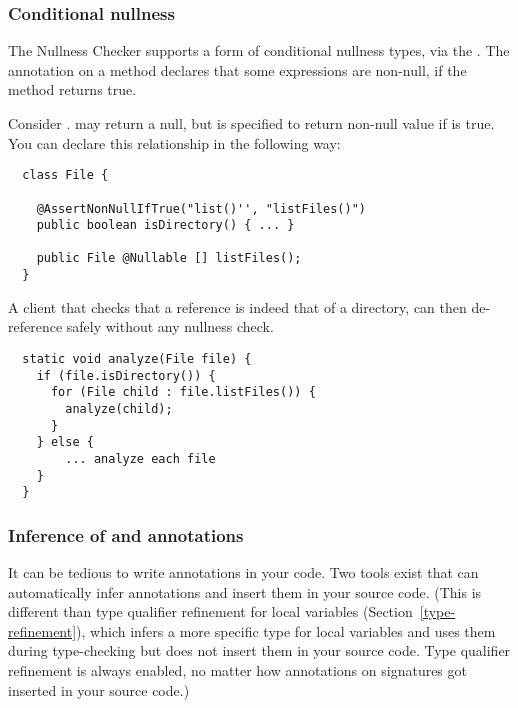 \subsubsection{Conditional nullness}

The Nullness Checker supports a form of conditional nullness types, via the
.  The annotation
on a method declares that some expressions are non-null, if the method
returns true.

Consider .
 may
return a null, but is specified to return non-null value if
 is
true.  You can declare this relationship in the following way:

\begin{Verbatim}
  class File {

    @AssertNonNullIfTrue("list()'', "listFiles()")
    public boolean isDirectory() { ... }

    public File @Nullable [] listFiles();
  }
\end{Verbatim}

A client that checks that a  reference is indeed that of a directory,
can then de-reference  safely without any nullness check.

\begin{Verbatim}
  static void analyze(File file) {
    if (file.isDirectory()) {
      for (File child : file.listFiles()) {
        analyze(child);
      }
    } else {
        ... analyze each file
    }
  }
\end{Verbatim}


\subsubsection{Inference of  and  annotations\label{nullness-inference}}

It can be tedious to write annotations in your code.  Two tools exist that
can automatically infer annotations and insert them in your source code.
(This is different than type qualifier refinement for local variables
(Section~\ref{type-refinement}), which infers a more specific type for
local variables and uses them during type-checking but does not insert them
in your source code.  Type qualifier refinement is always enabled, no
matter how annotations on signatures got inserted in your source code.)

